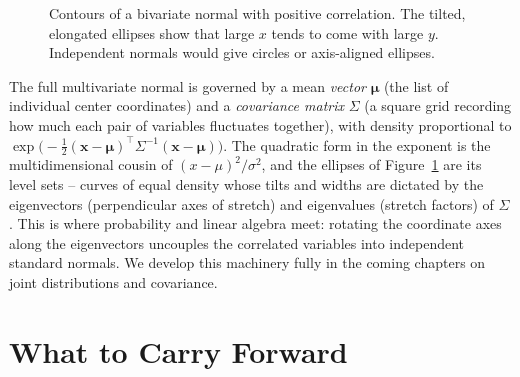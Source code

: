 \begin{figure}[H]
\centering
{}
\caption{Contours of a bivariate normal with positive correlation. The tilted,
elongated ellipses show that large $x$ tends to come with large $y$. Independent
normals would give circles or axis-aligned ellipses.}
\label{ch12:fig-bivariate}
\end{figure}

\begin{connectionbox}
The full multivariate normal is governed by a mean \emph{vector} $\boldsymbol\mu$
(the list of individual center coordinates) and a \emph{covariance matrix} $\Sigma$
(a square grid recording how much each pair of variables fluctuates together),
with density proportional to
$\exp\!\big(-\tfrac12 (\mathbf{x}-\boldsymbol\mu)^\top \Sigma^{-1}(\mathbf{x}-\boldsymbol\mu)\big)$.
The quadratic form in the exponent is the multidimensional cousin of
$(x-\mu)^2/\sigma^2$, and the ellipses of Figure~\ref{ch12:fig-bivariate} are its
level sets -- curves of equal density whose tilts and widths are dictated by the
eigenvectors (perpendicular axes of stretch) and eigenvalues (stretch factors) of
$\Sigma$. This is where probability and linear algebra meet: rotating the
coordinate axes along the eigenvectors uncouples the correlated variables into
independent standard normals. We develop this machinery fully in the coming
chapters on joint distributions and covariance.
\end{connectionbox}

\section{What to Carry Forward}
\label{ch12:summary}


